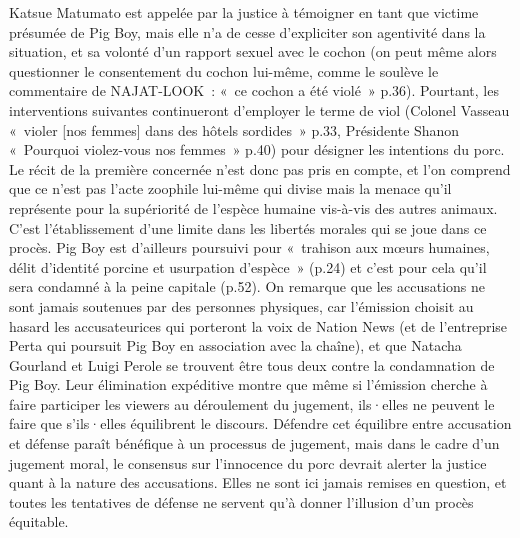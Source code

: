 \documentclass[
]{article}
\begin{document}
Katsue Matumato est appelée par la justice à témoigner en tant que victime présumée de Pig Boy, mais elle n'a de cesse d'expliciter son agentivité dans la situation, et sa volonté d'un rapport sexuel avec le cochon (on peut même alors questionner le consentement du cochon lui-même, comme le soulève le commentaire de NAJAT-LOOK~: «~ce cochon a été violé~» p.36). Pourtant, les interventions suivantes continueront d'employer le terme de viol (Colonel Vasseau «~violer {[}nos femmes{]} dans des hôtels sordides~» p.33, Présidente Shanon «~Pourquoi violez-vous nos femmes~» p.40) pour désigner les intentions du porc. Le récit de la première concernée n'est donc pas pris en compte, et l'on comprend que ce n'est pas l'acte zoophile lui-même qui divise mais la menace qu'il représente pour la supériorité de l'espèce humaine vis-à-vis des autres animaux. C'est l'établissement d'une limite dans les libertés morales qui se joue dans ce procès. Pig Boy est d'ailleurs poursuivi pour «~trahison aux mœurs humaines, délit d'identité porcine et usurpation d'espèce~» (p.24) et c'est pour cela qu'il sera condamné à la peine capitale (p.52). On remarque que les accusations ne sont jamais soutenues par des personnes physiques, car l'émission choisit au hasard les accusateurices qui porteront la voix de Nation News (et de l'entreprise Perta qui poursuit Pig Boy en association avec la chaîne), et que Natacha Gourland et Luigi Perole se trouvent être tous deux contre la condamnation de Pig Boy. Leur élimination expéditive montre que même si l'émission cherche à faire participer les viewers au déroulement du jugement, ils·elles ne peuvent le faire que s'ils·elles équilibrent le discours. Défendre cet équilibre entre accusation et défense paraît bénéfique à un processus de jugement, mais dans le cadre d'un jugement moral, le consensus sur l'innocence du porc devrait alerter la justice quant à la nature des accusations. Elles ne sont ici jamais remises en question, et toutes les tentatives de défense ne servent qu'à donner l'illusion d'un procès équitable.
\end{document}
